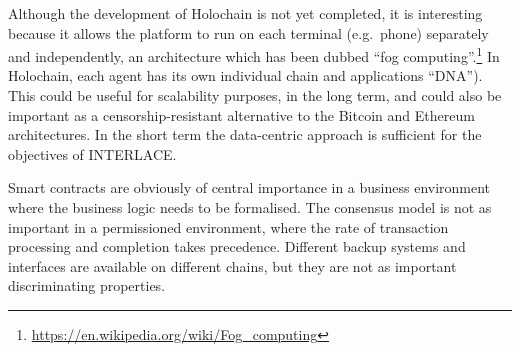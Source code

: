 Although the development of Holochain is not yet completed, it is interesting because it allows the platform to run on each terminal (e.g.\ phone) separately and independently, an architecture which has been dubbed ``fog computing''.\footnote{\url{https://en.wikipedia.org/wiki/Fog_computing}} In Holochain, each agent has its own individual chain and applications ``DNA''). This could be useful for scalability purposes, in the long term, and could also be important as a censorship-resistant alternative to the Bitcoin and Ethereum architectures. In the short term the data-centric approach is sufficient for the objectives of INTERLACE.

Smart contracts are obviously of central importance in a business environment where the business logic needs to be formalised. The consensus model is not as important in a permissioned environment, where the rate of transaction processing and completion takes precedence. Different backup systems and interfaces are available on different chains, but they are not as important discriminating properties.


